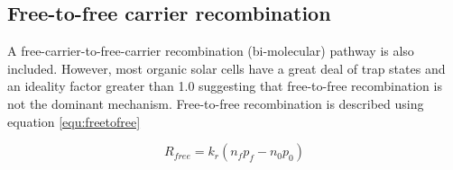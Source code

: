 
\subsection{Free-to-free carrier recombination}
A free-carrier-to-free-carrier recombination (bi-molecular) pathway is also included. However, most organic solar cells have a great deal of trap states and an ideality factor greater than 1.0 suggesting that free-to-free recombination is not the dominant mechanism.  Free-to-free recombination is described using equation \ref{equ:freetofree}

\begin{equation}
R_{free}=k_{r}(n_{f}p_{f}-n_{0}p_{0})
\label{equ:freetofree}
\end{equation}
